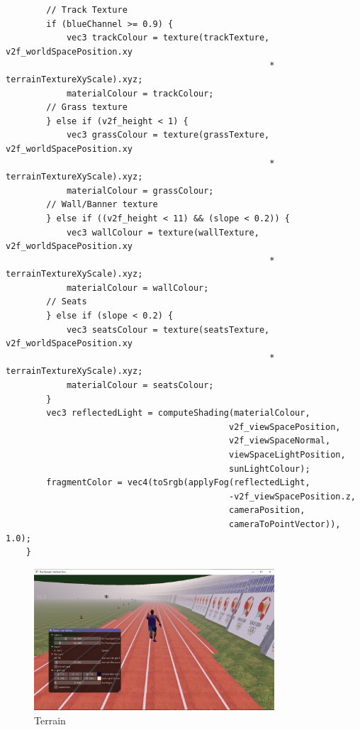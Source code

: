 \documentclass[a4 paper, 12pt]{article}
\begin{document}
\begin{lstlisting}
        // Track Texture
        if (blueChannel >= 0.9) {
            vec3 trackColour = texture(trackTexture, v2f_worldSpacePosition.xy 
                                                    * terrainTextureXyScale).xyz;
            materialColour = trackColour;
        // Grass texture
        } else if (v2f_height < 1) {
            vec3 grassColour = texture(grassTexture, v2f_worldSpacePosition.xy 
                                                    * terrainTextureXyScale).xyz;
            materialColour = grassColour; 
        // Wall/Banner texture
        } else if ((v2f_height < 11) && (slope < 0.2)) {
            vec3 wallColour = texture(wallTexture, v2f_worldSpacePosition.xy 
                                                    * terrainTextureXyScale).xyz;
            materialColour = wallColour;                  
        // Seats
        } else if (slope < 0.2) {
            vec3 seatsColour = texture(seatsTexture, v2f_worldSpacePosition.xy 
                                                    * terrainTextureXyScale).xyz;
            materialColour = seatsColour; 
        }
        vec3 reflectedLight = computeShading(materialColour,  
                                            v2f_viewSpacePosition, 
                                            v2f_viewSpaceNormal, 
                                            viewSpaceLightPosition, 
                                            sunLightColour);
        fragmentColor = vec4(toSrgb(applyFog(reflectedLight, 
                                            -v2f_viewSpacePosition.z, 
                                            cameraPosition, 
                                            cameraToPointVector)), 1.0);
    }

    \end{lstlisting}

\begin{figure} [H]
    \centering
    \includegraphics[width=0.8\textwidth, frame]
        {./images/olympics/terrain_world.PNG}  
    \caption{Terrain}   
\end{figure}
\end{document}
